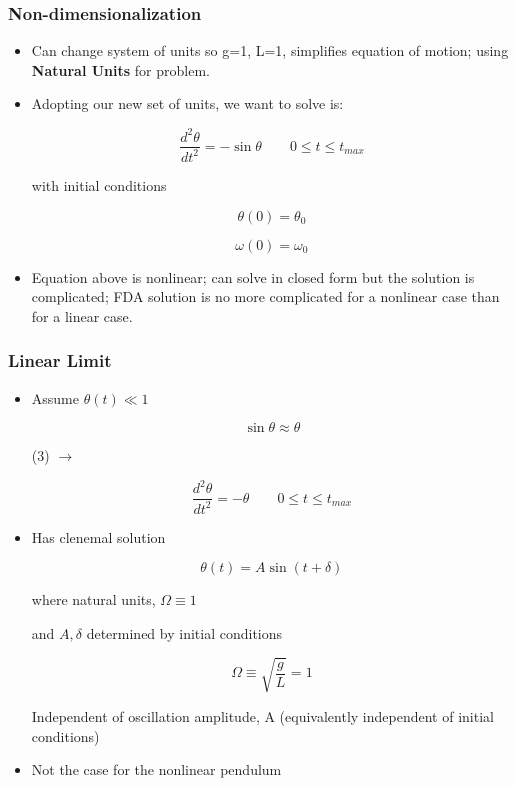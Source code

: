 \subsubsection{Non-dimensionalization}

\begin{itemize}
    \item Can change system of units so g=1, L=1, simplifies equation of motion; using \textbf{Natural Units} for problem.
    \item Adopting our new set of units, we want to solve is:

    \begin{equation}
        \frac{d^2\theta}{dt^2} = - \sin\theta \qquad 0 \leq t \leq t_{max}
    \end{equation}

    with initial conditions

    \begin{equation}
        \theta(0) = \theta_0
    \end{equation}

    \begin{equation}
        \omega(0) = \omega_0
    \end{equation}

    \item Equation above is nonlinear; can solve in closed form but the solution is complicated; FDA solution is no more complicated for a nonlinear case than for a linear case.
\end{itemize}

\subsubsection{Linear Limit}

\begin{itemize}
    \item Assume $\theta(t) \ll 1$

    \[ \sin \theta \approx \theta\]

    (3) $\rightarrow$

    \begin{equation}
        \frac{d^2\theta}{dt^2} = - \theta \qquad 0 \leq t \leq t_{max} 
    \end{equation}

    \item Has clenemal solution

    \[ \theta (t) = A \sin(t + \delta) \]

    where natural units, $\Omega \equiv 1$

    and $A, \delta $ determined by initial conditions

    \[ \Omega \equiv \sqrt{\frac{g}{L}} = 1 \]

    Independent of oscillation amplitude, A (equivalently independent of initial conditions)

    \item Not the case for the nonlinear pendulum
\end{itemize}

